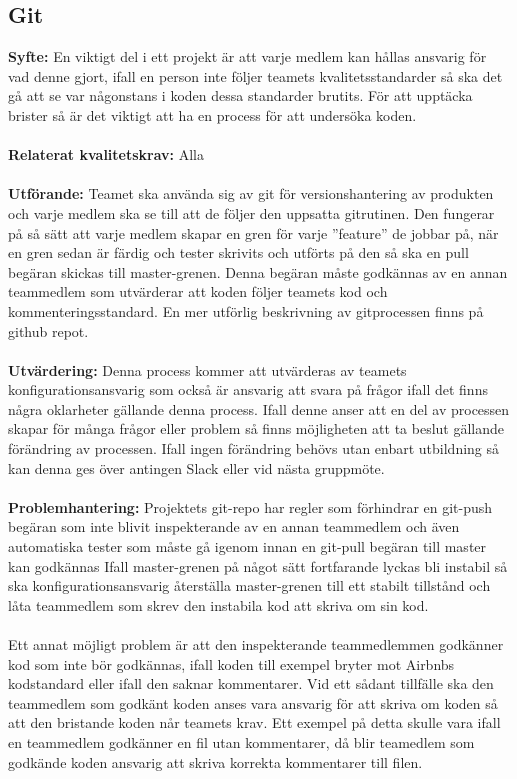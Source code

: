 \documentclass[10pt]{article}
\begin{document}
	\subsection{Git}
	\textbf{Syfte:} En viktigt del i ett projekt är att varje medlem kan hållas ansvarig för vad denne gjort, ifall en person inte följer teamets kvalitetsstandarder så ska det gå att se var någonstans i koden dessa standarder brutits. För att upptäcka brister så är det viktigt att ha en process för att undersöka koden.
	\\\\
	\textbf{Relaterat kvalitetskrav:} Alla
	\\\\
	\textbf{Utförande:} Teamet ska använda sig av git för versionshantering av produkten och varje medlem ska se till att de följer den uppsatta gitrutinen. Den fungerar på så sätt att varje medlem skapar en gren för varje ''feature'' de jobbar på, när en gren sedan är färdig och tester skrivits och utförts på den så ska en pull begäran skickas till master-grenen. Denna begäran måste godkännas av en annan teammedlem som utvärderar att koden följer teamets kod och kommenteringsstandard. En mer utförlig beskrivning av gitprocessen finns på github repot\cite{bib-gitguide}.
	\\\\
	\textbf{Utvärdering:} Denna process kommer att utvärderas av teamets konfigurationsansvarig som också är ansvarig att svara på frågor ifall det finns några oklarheter gällande denna process. Ifall denne anser att en del av processen skapar för många frågor eller problem så finns möjligheten att ta beslut gällande förändring av processen. Ifall ingen förändring behövs utan enbart utbildning så kan denna ges över antingen Slack eller vid nästa gruppmöte.
	\\\\
	\textbf{Problemhantering:} Projektets git-repo har regler som förhindrar en git-push begäran som inte blivit inspekterande av en annan teammedlem och även automatiska tester som måste gå igenom innan en git-pull begäran till master kan godkännas Ifall master-grenen på något sätt fortfarande lyckas bli instabil så ska konfigurationsansvarig återställa master-grenen till ett stabilt tillstånd och låta teammedlem som skrev den instabila kod att skriva om sin kod.\\\\
	Ett annat möjligt problem är att den inspekterande teammedlemmen godkänner kod som inte bör godkännas, ifall koden till exempel bryter mot Airbnbs kodstandard eller ifall den saknar kommentarer. Vid ett sådant tillfälle ska den teammedlem som godkänt koden anses vara ansvarig för att skriva om koden så att den bristande koden når teamets krav. Ett exempel på detta skulle vara ifall en teammedlem godkänner en fil utan kommentarer, då blir teamedlem som godkände koden ansvarig att skriva korrekta kommentarer till filen.
\end{document}
